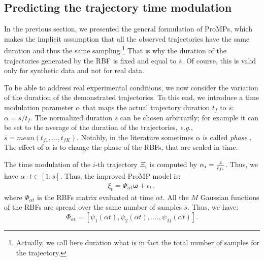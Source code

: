 \documentclass[utf8]{frontiersSCNS} %
\begin{document}
\subsection{Predicting the trajectory time modulation}\label{sec:predictDuration}
In the previous section, we presented the general formulation of ProMPs, which makes the implicit assumption that all the observed trajectories have the same duration and thus the same sampling.\footnote{Actually, we call here duration what is in fact the total number of samples for the trajectory.} That is why the duration of the trajectories generated by the RBF is fixed and equal to $\bar{s}$.
Of course, this is valid only for synthetic data and not for real data.

To be able to address real experimental conditions, we now consider the variation of the  duration of the demonstrated trajectories. 
To this end, we introduce a time modulation parameter $\alpha$ that maps the actual trajectory duration $t_{f}$ to $\bar{s}$: $\alpha = \bar{s} / t_{f}$.
The normalized duration $\bar{s}$ can be chosen arbitrarily; for example it can be set to the average of the  duration of the trajectories, \textit{e.g.}, $\bar{s}=mean(t_{f1},\ldots,t_{fK})$.
Notably, in the literature sometimes $\alpha$ is called \textit{phase} \cite{paraschos2013probabilistic,paraschos2013probabilisticTrajectory}. 
The effect of $\alpha$ is to change the phase of the RBFs, that are scaled in time.

The time modulation of the $i$-th trajectory $\Xi_i$ is computed by $ \alpha_i = {\bar{s} \over t_{fi}}$. Thus, we have $\alpha \cdot t \in [1:\bar{s}]$. Thus, the improved ProMP model is:
\begin{eqnarray}
\xi_t = \Phi_{\alpha t} \boldsymbol{\omega} + \epsilon_t \, ,
\end{eqnarray}
where $\Phi_{\alpha t}$ is the RBFs matrix evaluated at time $\alpha t$. All the $M$ Gaussian functions of the RBFs are spread over the same number of samples $\bar{s}$. Thus, we have:
$$ \Phi_{\alpha t}=[\psi_{1}(\alpha t), \psi_{2}(\alpha t), \ldots., \psi_{M}(\alpha t)].$$
\end{document}

